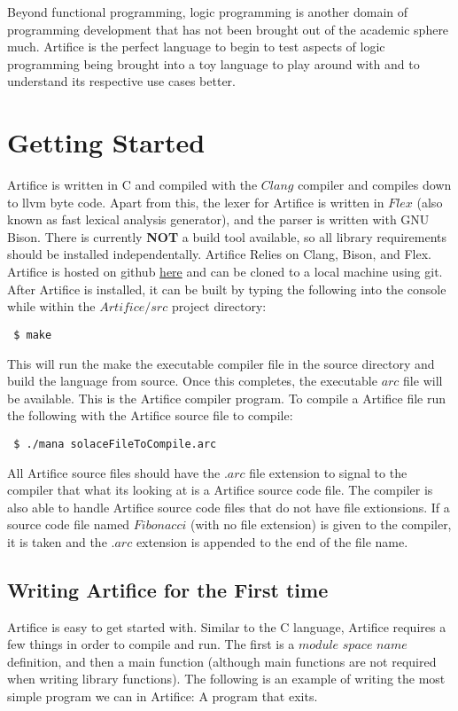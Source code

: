 \documentclass{article}
\begin{document}
Beyond functional programming, logic programming is another domain of programming development that has not been brought out
of the academic sphere much. Artifice is the perfect language to begin to test aspects of logic programming being brought into a
toy language to play around with and to understand its respective use cases better.


\section{Getting Started}
Artifice is written in C and compiled with the $Clang$ compiler and compiles down to llvm byte code. Apart from this, the lexer for Artifice is
written in $Flex$ (also known as fast lexical analysis generator), and the parser is written with GNU Bison. There is currently
\textbf{NOT} a  build tool available, so all library requirements should be installed independentally. Artifice Relies on Clang,
Bison, and Flex. Artifice is hosted on github \href{https://github.com/JustSomeCarbon/Artifice/tree/main}{here} and can be cloned
to a local machine using git. After Artifice is installed, it can be built by typing the following into the console while within the
$Artifice/src$ project directory:

\begin{lstlisting}
 $ make
\end{lstlisting}

This will run the make the executable compiler file in the source directory and build the language from source.
Once this completes, the executable $arc$ file will be available. This is the Artifice compiler program.
To compile a Artifice file run the following with the Artifice source file to compile:

\begin{lstlisting}
 $ ./mana solaceFileToCompile.arc
\end{lstlisting}

All Artifice source files should have the $.arc$ file extension to signal to the compiler that what its looking at is a
Artifice source code file. The compiler is also able to handle Artifice source code files that do not have file extionsions.
If a source code file named $Fibonacci$ (with no file extension) is given to the compiler, it is taken and the $.arc$ extension
is appended to the end of the file name.

\subsection{Writing Artifice for the First time}
Artifice is easy to get started with. Similar to the C language, Artifice requires a few things in order to compile
and run. The first is a $module$ $space$ $name$ definition, and then a main function (although main functions are not required when
writing library functions). The following is an example of writing the most simple program we can in Artifice: A program
that exits.
\end{document}
